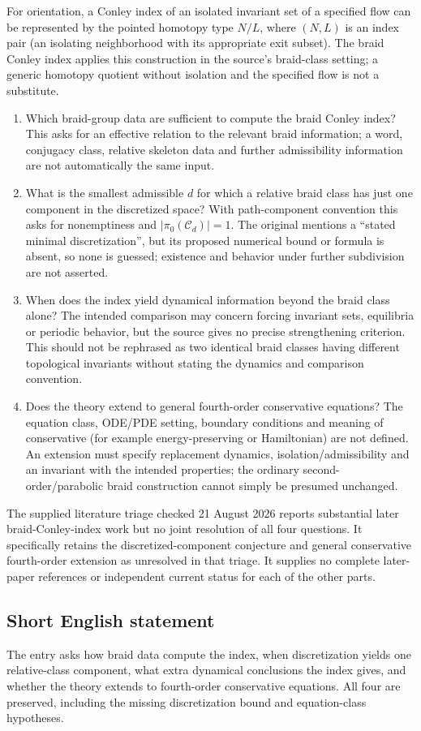 \documentclass[11pt]{article}
\begin{document}
For orientation, a Conley index of an isolated invariant set of a specified flow can be represented by the pointed homotopy type $N/L$, where $(N,L)$ is an index pair (an isolating neighborhood with its appropriate exit subset). The braid Conley index applies this construction in the source's braid-class setting; a generic homotopy quotient without isolation and the specified flow is not a substitute.
\begin{enumerate}
\item Which braid-group data are sufficient to compute the braid Conley index? This asks for an effective relation to the relevant braid information; a word, conjugacy class, relative skeleton data and further admissibility information are not automatically the same input.
\item What is the smallest admissible $d$ for which a relative braid class has just one component in the discretized space? With path-component convention this asks for nonemptiness and $|\pi_0(\mathcal C_d)|=1$. The original mentions a ``stated minimal discretization'', but its proposed numerical bound or formula is absent, so none is guessed; existence and behavior under further subdivision are not asserted.
\item When does the index yield dynamical information beyond the braid class alone? The intended comparison may concern forcing invariant sets, equilibria or periodic behavior, but the source gives no precise strengthening criterion. This should not be rephrased as two identical braid classes having different topological invariants without stating the dynamics and comparison convention.
\item Does the theory extend to general fourth-order conservative equations? The equation class, ODE/PDE setting, boundary conditions and meaning of conservative (for example energy-preserving or Hamiltonian) are not defined. An extension must specify replacement dynamics, isolation/admissibility and an invariant with the intended properties; the ordinary second-order/parabolic braid construction cannot simply be presumed unchanged.
\end{enumerate}
The supplied literature triage checked 21 August 2026 reports substantial later braid-Conley-index work but no joint resolution of all four questions. It specifically retains the discretized-component conjecture and general conservative fourth-order extension as unresolved in that triage. It supplies no complete later-paper references or independent current status for each of the other parts.
\subsection{Short English statement}
The entry asks how braid data compute the index, when discretization yields one relative-class component, what extra dynamical conclusions the index gives, and whether the theory extends to fourth-order conservative equations. All four are preserved, including the missing discretization bound and equation-class hypotheses.
\end{document}
